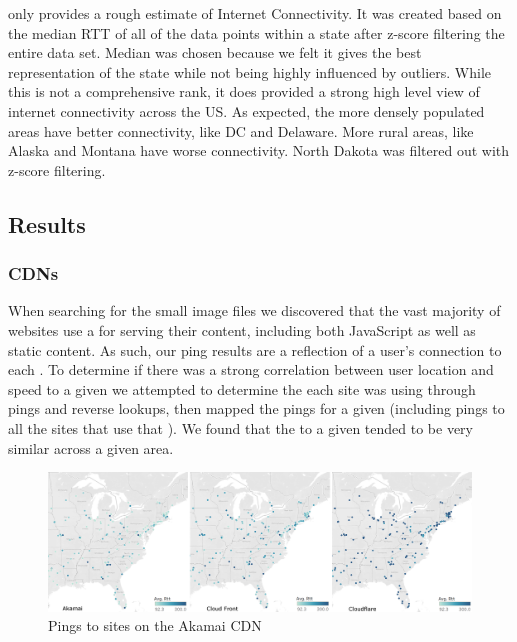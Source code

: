  

 only provides a rough estimate of Internet Connectivity. It was created based on the median RTT of all of the data points within a state after z-score filtering the entire data set. Median was chosen because we felt it gives the best representation of the state while not being highly influenced by outliers. While this is not a comprehensive rank, it does provided a strong high level view of internet connectivity across the US. As expected, the more densely populated areas have better connectivity, like DC and Delaware. More rural areas, like Alaska and Montana have worse connectivity. North Dakota was filtered out with z-score filtering.

\subsection{Results}

\subsubsection{CDNs}
When searching for the small image files we discovered that the vast majority of websites use a \cdn for serving their content, including both JavaScript as well as static content. As such, our ping results are a reflection of a user's connection to each \cdn. To determine if there was a strong correlation between user location and speed to a given \cdn we attempted to determine the \cdn each site was using through \icmp pings and reverse \dns lookups, then mapped the pings for a given \cdn (including pings to all the sites that use that \cdn). We found that the \rtt to a given \cdn tended to be very similar across a given area.

\begin{figure}[htb]
    \centering
    \includegraphics[width=1\textwidth]{images/siteping/cdn_combined.png}
    \caption{Pings to sites on the Akamai CDN} %
    \label{fig:akamai_cdn}
\end{figure}

